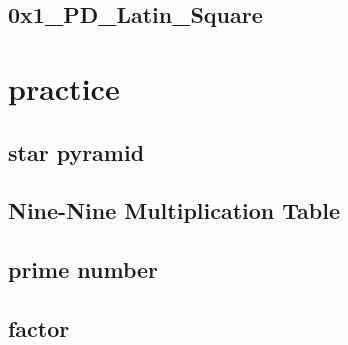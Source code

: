     \subsection{0x1_PD_Latin_Square}
        

\section{practice}
    \subsection{star pyramid}
            
    \subsection{Nine-Nine Multiplication Table}
        
    \subsection{prime number}
        
    \subsection{factor}
        